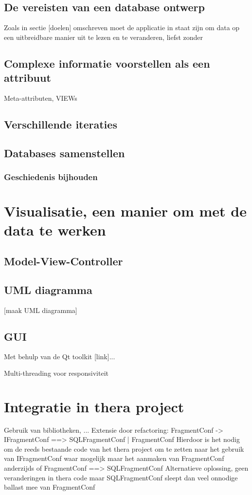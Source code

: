 \subsection{De vereisten van een database ontwerp}
Zoals in sectie [doelen] omschreven moet de applicatie in staat zijn om data op een uitbreidbare manier uit te lezen en te veranderen, liefst zonder 

\subsection{Complexe informatie voorstellen als een attribuut}
Meta-attributen, VIEWs

\subsection{Verschillende iteraties}

\subsection{Databases samenstellen}

\subsubsection{Geschiedenis bijhouden}

\section{Visualisatie, een manier om met de data te werken}

\subsection{Model-View-Controller}

\subsection{UML diagramma}

[maak UML diagramma]\\

\subsection{GUI}
Met behulp van de Qt toolkit [link]...

Multi-threading voor responsiviteit

\section{Integratie in thera project}
Gebruik van bibliotheken, ...
Extensie door refactoring: FragmentConf -> IFragmentConf ==> SQLFragmentConf | FragmentConf
Hierdoor is het nodig om de reeds bestaande code van het thera project om te zetten naar het gebruik van IFragmentConf waar mogelijk maar het aanmaken van FragmentConf anderzijds
of FragmentConf ==> SQLFragmentConf
Alternatieve oplossing, geen veranderingen in thera code maar SQLFragmentConf sleept dan veel onnodige ballast mee van FragmentConf

